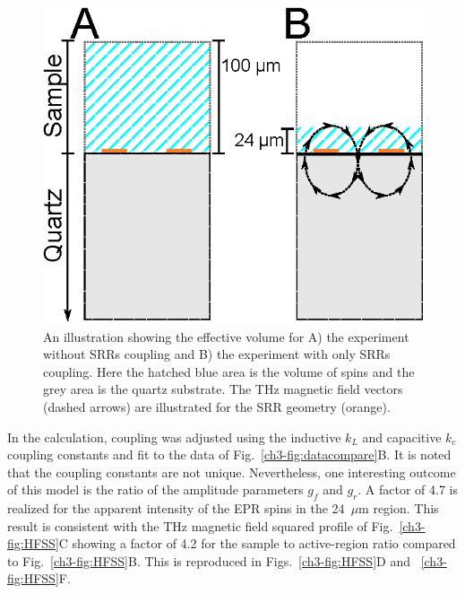 \begin{figure}[htbp]\centering
  \includegraphics{Kapitel/Ch3-Images/Ch4-SampleVisualization.eps}%
  \caption[Illustration of the excited sample volumes.]{An illustration showing the effective volume for A) the experiment without SRRs coupling and B) the experiment with only SRRs coupling. Here the hatched blue area is the volume of spins and the grey area is the quartz substrate. The THz magnetic field vectors (dashed arrows) are illustrated for the SRR geometry (orange).
  \label{ch3-fig:effetachi}}
\end{figure}

In the calculation, coupling was adjusted using the inductive $k_L$ and capacitive $k_c$ coupling constants and fit to the data of Fig.~\ref{ch3-fig:datacompare}B. It is noted that the coupling constants are not unique. Nevertheless, one interesting outcome of this model is the ratio of the amplitude parameters $g_f$ and $g_r$. A factor of 4.7 is realized for the apparent intensity of the EPR spins in the 24~$\mu$m region. This result is consistent with the THz magnetic field squared profile of Fig.~\ref{ch3-fig:HFSS}C showing a factor of 4.2 for the sample to active-region ratio compared to Fig.~\ref{ch3-fig:HFSS}B. This is reproduced in Figs.~\ref{ch3-fig:HFSS}D and ~\ref{ch3-fig:HFSS}F.

